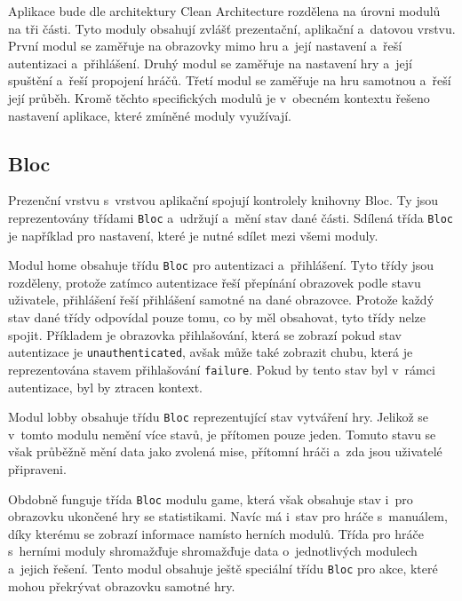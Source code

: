 Aplikace bude dle architektury Clean Architecture rozdělena
na úrovni modulů na tři části.
Tyto moduly obsahují zvlášť prezentační, aplikační a~datovou vrstvu.
První modul se zaměřuje na obrazovky mimo hru a~její nastavení
a~řeší autentizaci a~přihlášení.
Druhý modul se zaměřuje na nastavení hry a~její spuštění a~řeší propojení hráčů.
Třetí modul se zaměřuje na hru samotnou a~řeší její průběh.
Kromě těchto specifických modulů je v~obecném kontextu řešeno nastavení
aplikace,
které zmíněné moduly využívají.

\subsection{Bloc}

Prezenční vrstvu s~vrstvou aplikační spojují kontrolely knihovny Bloc.
Ty jsou reprezentovány třídami \texttt{Bloc} a~udržují a~mění stav
dané části.
Sdílená třída \texttt{Bloc} je například pro nastavení,
které je nutné sdílet mezi všemi moduly.

Modul home obsahuje třídu \texttt{Bloc} pro autentizaci a~přihlášení.
Tyto třídy jsou rozděleny,
protože zatímco autentizace řeší přepínání obrazovek podle stavu uživatele,
přihlášení řeší přihlášení samotné na dané obrazovce.
Protože každý stav dané třídy odpovídal pouze tomu,
co by měl obsahovat,
tyto třídy nelze spojit.
Příkladem je obrazovka přihlašování,
která se zobrazí pokud stav autentizace je \texttt{unauthenticated},
avšak může také zobrazit chubu,
která je reprezentována stavem přihlašování \texttt{failure}.
Pokud by tento stav byl v~rámci autentizace,
byl by ztracen kontext.

Modul lobby obsahuje třídu \texttt{Bloc} reprezentující stav
vytváření hry.
Jelikož se v~tomto modulu nemění více stavů,
je přítomen pouze jeden.
Tomuto stavu se však průběžně mění data jako zvolená mise,
přítomní hráči a~zda jsou uživatelé připraveni.

Obdobně funguje třída \texttt{Bloc} modulu game,
která však obsahuje stav i~pro obrazovku ukončené hry se statistikami.
Navíc má i~stav pro hráče s~manuálem,
díky kterému se zobrazí informace namísto herních modulů.
Třída pro hráče s~herními moduly shromažďuje shromažďuje data o~jednotlivých
modulech a~jejich řešení.
Tento modul obsahuje ještě speciální třídu \texttt{Bloc} pro akce,
které mohou překrývat obrazovku samotné hry.
